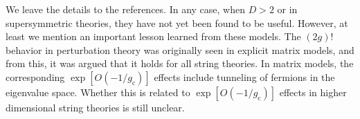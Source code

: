 We leave the details to the references. In any case, when $D>2$ or in supersymmetric theories, they have not yet been found to be useful. 
However, at least we mention an important lesson learned from these models. The $(2g)!$ behavior in perturbation theory was originally seen in explicit matrix models, and from this, it was argued that it holds for all string theories.
In matrix models, the corresponding $\exp [O(-1 / g_{\mathrm{c}})]$ effects include tunneling of fermions in the eigenvalue space. 
Whether this is related to $\exp [O(-1 / g_{\mathrm{c}})]$ effects in higher dimensional string theories is still unclear.